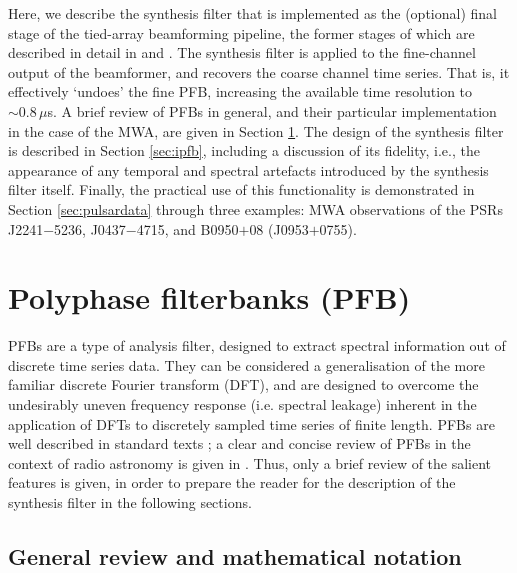 \documentclass{pasa}%
\newcommand{\psrslowB}{B0950$+$08}
\newcommand{\psrslowJ}{J0953$+$0755}
\newcommand{\psrkaurJ}{J2241$-$5236}
\newcommand{\psrbhatJ}{J0437$-$4715}
\begin{document}
Here, we describe the synthesis filter that is implemented as the (optional) final stage of the tied-array beamforming pipeline, the former stages of which are described in detail in \citet[][hereafter Paper I]{Ord2019} and \citet[][hereafter Paper II]{Xue2019}.
The synthesis filter is applied to the fine-channel output of the beamformer, and recovers the coarse channel time series.
That is, it effectively `undoes' the fine PFB, increasing the available time resolution to $\sim 0.8\,\mu$s.
A brief review of PFBs in general, and their particular implementation in the case of the MWA, are given in Section \ref{sec:pfb}.
The design of the synthesis filter is described in Section \ref{sec:ipfb}, including a discussion of its fidelity, i.e., the appearance of any temporal and spectral artefacts introduced by the synthesis filter itself.
Finally, the practical use of this functionality is demonstrated in Section \ref{sec:pulsardata} through three examples: MWA observations of the PSRs \psrkaurJ{}, \psrbhatJ{}, and \psrslowB{} (\psrslowJ{}).

\section{Polyphase filterbanks (PFB)}
\label{sec:pfb}

PFBs are a type of analysis filter, designed to extract spectral information out of discrete time series data.
They can be considered a generalisation of the more familiar discrete Fourier transform (DFT), and are designed to overcome the undesirably uneven frequency response (i.e. spectral leakage) inherent in the application of DFTs to discretely sampled time series of finite length.
PFBs are well described in standard texts \citep{Crochiere1983,Harris2004,Oppenheim2009}; a clear and concise review of PFBs in the context of radio astronomy is given in \citet{Harris2011}.
Thus, only a brief review of the salient features is given, in order to prepare the reader for the description of the synthesis filter in the following sections.

\subsection{General review and mathematical notation}
\end{document}
